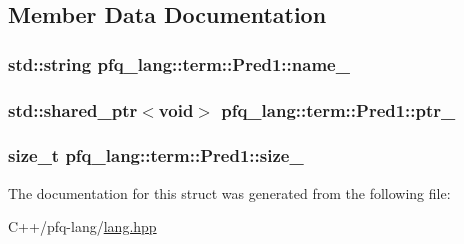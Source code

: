 \subsection{Member Data Documentation}
\hypertarget{structpfq__lang_1_1term_1_1Pred1_a2e8fa633d20f23a5bda4f1d1d2d7c40a}{
\subsubsection[{name\+\_\+}]{\setlength{\rightskip}{0pt plus 5cm}std\+::string pfq\+\_\+lang\+::term\+::\+Pred1\+::name\+\_\+}}\label{structpfq__lang_1_1term_1_1Pred1_a2e8fa633d20f23a5bda4f1d1d2d7c40a}
\hypertarget{structpfq__lang_1_1term_1_1Pred1_aab8272102e260db367460682dc3f51c5}{
\subsubsection[{ptr\+\_\+}]{\setlength{\rightskip}{0pt plus 5cm}std\+::shared\+\_\+ptr$<$void$>$ pfq\+\_\+lang\+::term\+::\+Pred1\+::ptr\+\_\+}}\label{structpfq__lang_1_1term_1_1Pred1_aab8272102e260db367460682dc3f51c5}
\hypertarget{structpfq__lang_1_1term_1_1Pred1_a00e31cd95cdaeed41806c33a487072f8}{
\subsubsection[{size\+\_\+}]{\setlength{\rightskip}{0pt plus 5cm}size\+\_\+t pfq\+\_\+lang\+::term\+::\+Pred1\+::size\+\_\+}}\label{structpfq__lang_1_1term_1_1Pred1_a00e31cd95cdaeed41806c33a487072f8}


The documentation for this struct was generated from the following file\+:\begin{DoxyCompactItemize}
\item 
C++/pfq-\/lang/\hyperlink{lang_8hpp}{lang.\+hpp}\end{DoxyCompactItemize}
